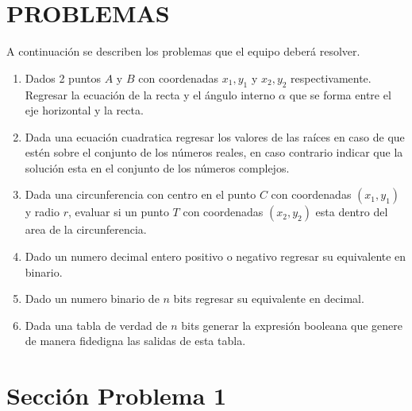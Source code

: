 \documentclass{IEEEcsmag}
\begin{document}
\section{PROBLEMAS}
A continuación se describen los problemas que el equipo deberá resolver.
\begin{enumerate}
\item Dados 2 puntos $A \mbox{ y } B$ con coordenadas $x_{1}, y_{1}$ y $x_{2}, y_{2}$  respectivamente. Regresar la ecuación de la recta y el ángulo interno $\alpha$ que se forma entre el eje horizontal y la recta. 
\item Dada una ecuación cuadratica regresar los valores de las raíces en caso de que estén sobre el conjunto de los números reales, en caso contrario indicar que la solución esta en el conjunto de los números complejos. 
\item Dada una circunferencia con centro en el punto $C$ con coordenadas $(x_{1}, y_{1})$ y radio $r$, evaluar si un punto $T$ con coordenadas $(x_{2}, y_{2})$ esta dentro del area de la circunferencia.
\item Dado un numero decimal entero positivo o negativo regresar su equivalente en binario.
\item Dado un numero binario de $n$ bits regresar su equivalente en decimal.
\item Dada una tabla de verdad de $n$ bits generar la expresión booleana que genere de manera fidedigna las salidas de esta tabla.
\end{enumerate}

\section{Sección Problema 1}
\end{document}
